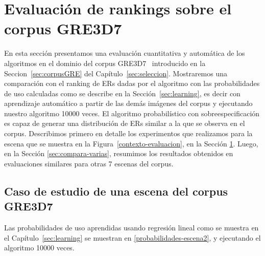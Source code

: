 \section{Evaluaci\'on de rankings sobre el corpus GRE3D7}
\label{sec:compara}
En esta sección presentamos una evaluación cuantitativa y automática de los algoritmos en el dominio del corpus GRE3D7~\cite{gre3d7} introducido en la Seccion~\ref{sec:corpusGRE} del Capítulo~\ref{sec:seleccion}. Mostraremos una comparaci\'on con el ranking de ERs dadas por el algoritmo con las probabilidades de uso calculadas como se describe en la Secci\'on~\ref{sec:learning}, es decir con aprendizaje autom\'atico a partir de las dem\'as im\'agenes del corpus y ejecutando nuestro algoritmo 10000 veces. El algoritmo probabilístico con sobreespecificación es capaz de generar una distribución de ERs similar a la que se observa en el corpus. Describimos primero en detalle los experimentos que realizamos para la escena que se muestra en la Figura~\ref{contexto-evaluacion}, en la Sección \ref{sec:compara}. Luego, en la Sección \ref{sec:compara-varias}, resumimos los resultados obtenidos en evaluaciones similares para otras 7 escenas del corpus. 
\subsection{Caso de estudio de una escena del corpus GRE3D7}

Las probabilidades de uso aprendidas usando regresión lineal como se muestra en el Capítulo~\ref{sec:learning} se muestran en \ref{probabilidades-escena2}, y ejecutando el algoritmo 10000 veces.


